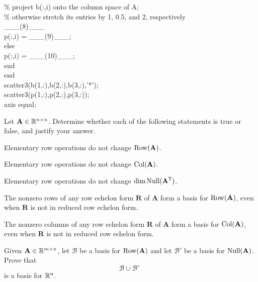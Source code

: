 \documentclass[11pt,oneside]{article}
\begin{document}
\begin{problem}
{\begin{tabbing}
\>\% project b(:,i) onto the column space of A;\\
\>\% otherwise stretch its entries by 1, 0.5, and 2, respectively\\
\>\_\_\_(8)\_\_\_\\
\>\>p(:,i) = \_\_\_(9)\_\_\_;\\
\>else\\
\>\>p(:,i) = \_\_\_(10)\_\_\_;\\
\>end\\
end\\[0.15em]
scatter3(b(1,:),b(2,:),b(3,:),'*');\\
scatter3(p(1,:),p(2,:),p(3,:));\\
axis equal;
\end{tabbing}
}
\end{problem}

\begin{problem}
Let $\mathbf A\in\mathbb{R}^{n\times n}$. Determine whether each of the following statements is true or false, and justify your answer.
\begin{problemsubparts}
\item Elementary row operations do not change $\operatorname{Row}(\mathbf A)$.
\item Elementary row operations do not change $\operatorname{Col}(\mathbf A)$.
\item Elementary row operations do not change $\dim\operatorname{Null}(\mathbf A^{\mathsf T})$.
\item The nonzero rows of any row echelon form $\mathbf R$ of $\mathbf A$ form a basis for $\operatorname{Row}(\mathbf A)$, even when $\mathbf R$ is not in reduced row echelon form.
\item The nonzero columns of any row echelon form $\mathbf R$ of $\mathbf A$ form a basis for $\operatorname{Col}(\mathbf A)$, even when $\mathbf R$ is not in reduced row echelon form.
\end{problemsubparts}
\end{problem}

\begin{problem}
Given $\mathbf A\in\mathbb{R}^{m\times n}$, let $\mathcal B$ be a basis for $\operatorname{Row}(\mathbf A)$ and let $\mathcal B'$ be a basis for $\operatorname{Null}(\mathbf A)$. Prove that
\[
\mathcal B\cup\mathcal B'
\]
is a basis for $\mathbb{R}^n$.
\end{problem}
\end{document}
